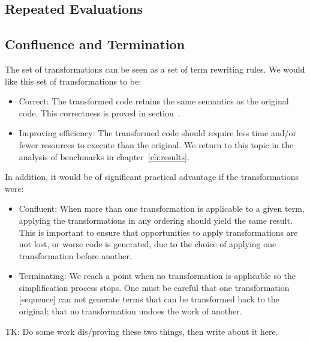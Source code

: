 \subsection{Repeated Evaluations}


\subsection{Confluence and Termination}

The set of transformations can be seen as a set of term rewriting rules. We
would like this set of transformations to be:
%
\begin{itemize}
    \item Correct: The transformed code retains the same semantics as the
        original code. This correctness is proved in
        section~\derp.

    \item Improving efficiency: The transformed code should require less time
        and/or fewer resources to execute than the original. We return to this
        topic in the analysis of benchmarks in chapter~\ref{ch:results}.
\end{itemize}
%
In addition, it would be of significant practical advantage if the
transformations were:
%
\begin{itemize}
    \item Confluent: When more than one transformation is applicable to a given
        term, applying the transformations in any ordering should yield the same
        result. This is important to ensure that opportunities to apply
        transformations are not lost, or worse code is generated, due to
        the choice of applying one transformation before another.

    \item Terminating: We reach a point when no transformation is applicable so
        the simplification process stops. One must be careful that one
        transformation [sequence] can not generate terms that can be transformed
        back to the original; that no transformation undoes the work of another.
\end{itemize}

TK: Do some work dis/proving these two things, then write about it here.


